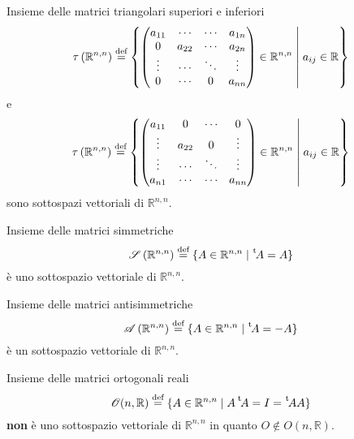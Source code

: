 \begin{Def}{Insieme delle matrici triangolari superiori e inferiori}
    \begin{equation*}
      \tau \left( \mathbb{R}^{n,n} \right)\bydef \left\{
        \begin{pmatrix}
          a_{11} & \cdots & \cdots & a_{1n}\\
          0 & a_{22} & \cdots & a_{2n}\\
          \vdots & \cdots & \ddots & \vdots\\
          0 & \cdots & 0 & a_{nn}
        \end{pmatrix}\in\mathbb{R}^{n,n}
        \Setsuchthat a_{ij}\in\mathbb{R}
      \right\}
    \end{equation*}
    e
    \begin{equation*}
      \tau \left( \mathbb{R}^{n,n} \right)\bydef \left\{
        \begin{pmatrix}
          a_{11} & 0 & \cdots & 0\\
          \vdots & a_{22} & 0 & \vdots\\
          \vdots & \cdots & \ddots & \vdots\\
          a_{n1} & \cdots & \cdots & a_{nn}
        \end{pmatrix}\in\mathbb{R}^{n,n}
        \Setsuchthat a_{ij}\in\mathbb{R}
      \right\}
    \end{equation*}
    sono sottospazi vettoriali di $\mathbb{R}^{n,n}$.
\end{Def}

\begin{Def}{Insieme delle matrici simmetriche}
  \begin{equation*}
    \mathscr{S}\left( \mathbb{R}^{n,n} \right)\bydef \left\{A\in\mathbb{R}^{n,n}\Setsuchthat
    \transp A = A\right\}
  \end{equation*}
  è uno sottospazio vettoriale di $\mathbb{R}^{n,n}$.
\end{Def}

\begin{Def}{Insieme delle matrici antisimmetriche}
  \begin{equation*}
    \mathscr{A}\left( \mathbb{R}^{n,n} \right)\bydef \left\{A\in\mathbb{R}^{n,n}\Setsuchthat
    \transp A = -A\right\}
  \end{equation*}
  è un sottospazio vettoriale di $\mathbb{R}^{n,n}$.
\end{Def}

\begin{Def}{Insieme delle matrici ortogonali reali}
  \begin{equation*}
    \mathscr{O}(n,\mathbb{R})\bydef \left\{ A\in\mathbb{R}^{n,n}\Setsuchthat A\transp A
    = I = \transp A A\right\}
  \end{equation*}
  \textbf{non} è uno sottospazio vettoriale di $\mathbb{R}^{n,n}$ in quanto $O\notin
  O(n,\mathbb{R})$.
\end{Def}

